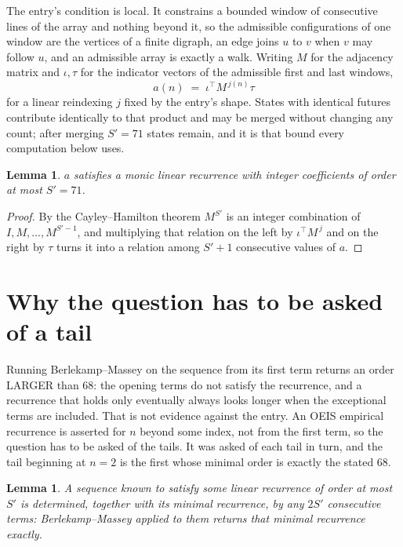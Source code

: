 \documentclass[11pt,a4paper]{article}
\theoremstyle{plain}
\newtheorem{lemma}[theorem]{Lemma}
\theoremstyle{definition}
\begin{document}
The entry's condition is local. It constrains a bounded window of consecutive lines of the
array and nothing beyond it, so the admissible configurations of one window are the vertices of
a finite digraph, an edge joins $u$ to $v$ when $v$ may follow $u$, and an admissible array is
exactly a walk. Writing $M$ for the adjacency matrix and $\iota,\tau$ for the indicator vectors
of the admissible first and last windows,
\[
a(n)\;=\;\iota^{\!\top}M^{\,j(n)}\tau
\]
for a linear reindexing $j$ fixed by the entry's shape. States with identical futures
contribute identically to that product and may be merged without changing any count; after
merging $S'=71$ states remain, and it is that bound every computation below uses.

\begin{lemma}\label{lem:cf}
$a$ satisfies a monic linear recurrence with integer coefficients of order at most $S'=71$.
\end{lemma}

\begin{proof}
By the Cayley--Hamilton theorem $M^{S'}$ is an integer combination of $I,M,\dots,M^{S'-1}$,
and multiplying that relation on the left by $\iota^{\!\top}M^{\,j}$ and on the right by
$\tau$ turns it into a relation among $S'+1$ consecutive values of $a$.
\end{proof}

\section{Why the question has to be asked of a tail}

Running Berlekamp--Massey on the sequence from its first term returns an order LARGER than $68$: the opening terms do not satisfy the recurrence, and a recurrence that holds only eventually always looks longer when the exceptional terms are included. That is not evidence against the entry. An OEIS empirical recurrence is asserted for $n$ beyond some index, not from the first term, so the question has to be asked of the tails. It was asked of each tail in turn, and the tail beginning at $n=2$ is the first whose minimal order is exactly the stated $68$.

\begin{lemma}\label{lem:bm}
A sequence known to satisfy some linear recurrence of order at most $S'$ is determined,
together with its minimal recurrence, by any $2S'$ consecutive terms: Berlekamp--Massey applied
to them returns that minimal recurrence exactly.
\end{lemma}
\end{document}
